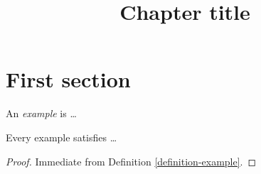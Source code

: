 %
%



\title{Chapter title}
\maketitle
\tableofcontents

\section{First section}
\label{section-first-section}

\begin{definition}
\label{definition-example}
An \emph{example} is \ldots
\end{definition}

\begin{lemma}
\label{lemma-example}
Every example satisfies \ldots
\end{lemma}

\begin{proof}
Immediate from Definition \ref{definition-example}.
\end{proof}



